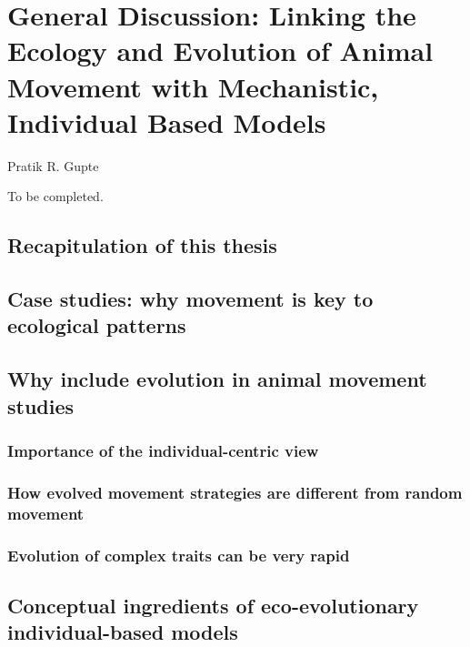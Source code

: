 
{}%
\chapter{General Discussion: Linking the Ecology and Evolution of Animal Movement with Mechanistic, Individual Based Models}\label{ch:discussion}

{{Pratik R. Gupte}}

To be completed.

\newrefcontext[sorting=ynt]

\section*{Recapitulation of this thesis}

\section*{Case studies: why movement is key to ecological patterns}

\section*{Why include evolution in animal movement studies}

\subsection*{Importance of the individual-centric view}

\subsection*{How evolved movement strategies are different from random movement}

\subsection*{Evolution of complex traits can be very rapid}

\section*{Conceptual ingredients of eco-evolutionary individual-based models}

